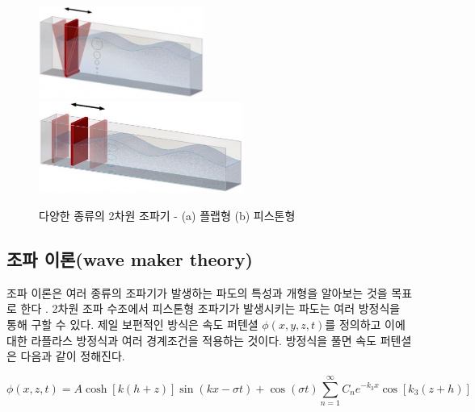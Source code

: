 \begin{figure}[H]
    \begin{center}
        \includegraphics[height=3cm]{images/Wave_Maker(Flap).jpg}
        \includegraphics[height=3cm]{images/Wave_Maker(Piston).jpg}
    \end{center}
        \caption{다양한 종류의 2차원 조파기 - (a) 플랩형 (b) 피스톤형}
        \label{Experimnet_System} 
\end{figure}

\subsection{조파 이론(wave maker theory)}

조파 이론은 여러 종류의 조파기가 발생하는 파도의 특성과 개형을 알아보는 것을 목표로 한다\cite{zhang2007deterministic} \cite{ojk2018}.
2차원 조파 수조에서 피스톤형 조파기가 발생시키는 파도는 여러 방정식을 통해 구할 수 있다. 제일 보편적인 방식은 속도 퍼텐셜 $\phi(x, y, z, t)$를 정의하고 이에 대한 라플라스 방정식과 여러 경계조건을 적용하는 것이다. 방정식을 풀면 속도 퍼텐셜은 다음과 같이 정해진다.

\begin{equation} \label{eq:1}
{
\phi(x, z, t) = A\cosh{[k(h+z)]}\sin(kx-\sigma t) +
\cos(\sigma t){\sum_{n=1}^{\infty}} C_n e^{-k_3 x} \cos{[k_3 (z+h)]} 
}
\end{equation}


